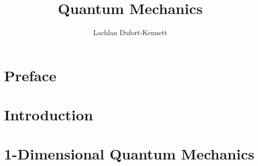 \documentclass{lecture-notes}
\title{Quantum Mechanics}
\author{Lachlan Dufort-Kennett}
\begin{document}
    \frontmatter
    \maketitle
    \tableofcontents

    \chapter{Preface}

    \mainmatter
    \chapter{Introduction}
    
    \chapter{1-Dimensional Quantum Mechanics}
    

    \backmatter
    \nocite{*}
    
    
\end{document}
